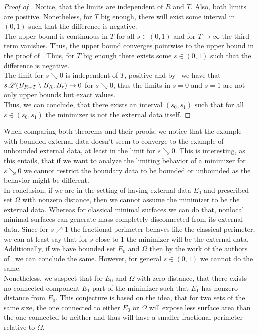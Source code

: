 \begin{proof}[Proof of ]
	Notice, that the limits are independent of \( R \) and \( T \). Also, both limits are positive.
	Nonetheless, for \( T \) big enough, there will exist some interval in \( (0, 1) \) such that the
	difference is negative. \\

	The upper bound  is continuous in \( T \) for all \( s \in (0, 1) \) and for \( T \to
	\infty \) the third term vanishes. Thus, the upper bound converges pointwise to the upper bound in
	the proof of . Thus, for \( T \) big enough there exists some \( s \in (0, 1) \) such
	that the difference is negative. \\

	The limit for \( s \searrow 0 \) is independent of \( T \), positive and by~\cite[Eq.
		(3.2)]{dipierro2012asymptotics} we have that \( s \operatorname{\mathscr{L}}(B_{R + T}\setminus B_R, B_r) \to 0 \) for \(
	s \searrow 0 \), thus the limits in \( s = 0 \) and \( s = 1 \) are not only upper bounds but
	exact values. \\

	Thus, we can conclude, that there exists an interval \( (s_0, s_1) \) such that for all \( s \in
	(s_0, s_1) \) the minimizer is not the external data itself.

\end{proof}

When comparing both theorems and their proofs, we notice that the example with bounded external
data doesn't seem to converge to the example of unbounded external data, at least in the limit for
\( s \searrow 0 \). This is interesting, as this entails, that if we want to analyze the limiting
behavior of a minimizer for \( s \searrow 0 \) we cannot restrict the boundary data to be bounded or
unbounded as the behavior might be different. \\

In conclusion, if we are in the setting of having external data \( E_0 \) and prescribed set \(
\Omega \) with nonzero distance, then we cannot assume the minimizer to be the external data.
Whereas for classical minimal surfaces we can do that, nonlocal minimal surfaces can generate mass
completely disconnected from its external data. Since for \( s \nearrow 1 \) the fractional
perimeter behaves like the classical perimeter, we can at least say that for \( s \) close to 1 the
minimizer will be the external data. Additionally, if we have bounded set \( E_0 \) and \( \Omega \)
then by the work of the authors of~\cite{dipierro2012asymptotics} we can conclude the same. However,
for general \( s \in (0, 1) \) we cannot do the same. \\

Nonetheless, we suspect that for \( E_0 \) and \( \Omega \) with zero distance, that there exists no
connected component \( E_1 \) part of the minimizer such that \( E_1 \) has nonzero distance from \(
E_0 \). This conjecture is based on the idea, that for two sets of the same size, the one connected
to either \( E_0 \) or \( \Omega \) will expose less surface area than the one connected to neither
and thus will have a smaller fractional perimeter relative to \( \Omega \).
